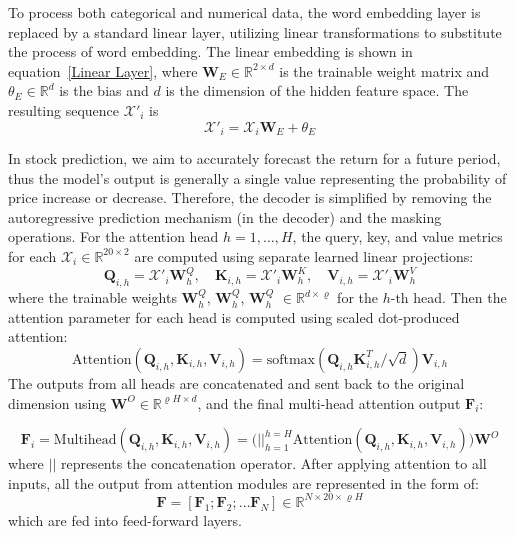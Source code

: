 \documentclass[preprint,12pt]{elsarticle}
\begin{document}
To process both categorical and numerical data, the word embedding layer is replaced by a standard linear layer, utilizing linear transformations to substitute the process of word embedding. The linear embedding is shown in equation~\ref{Linear Layer}, where $\mathbf{W}_E \in \mathbb{R}^{2 \times d}$ is the trainable weight matrix and $\theta_E \in \mathbb{R}^d$ is the bias and $d$ is the dimension of the hidden feature space. The resulting sequence $\mathcal{X}'_i$ is
\begin{equation}
\mathcal{X}'_i = \mathcal{X}_i \mathbf{W}_E + \theta_E
\label{Linear Layer}
\end{equation}

In stock prediction, we aim to accurately forecast the return for a future period, thus the model's output is generally a single value representing the probability of price increase or decrease. Therefore, the decoder is simplified by removing the autoregressive prediction mechanism (in the decoder) and the masking operations. For the attention head $h = 1,\ldots , H$, the query, key, and value metrics for each $\mathcal{X}_i \in \mathbb{R}^{20\times2}$ are computed using separate learned linear projections:
\begin{equation}
\mathbf{Q}_{i,h}=\mathcal{X}'_i \mathbf{W}^{Q}_{h}, \quad \mathbf{K}_{i,h}=\mathcal{X}'_i \mathbf{W}^{K}_{h}, \quad \mathbf{V}_{i,h}=\mathcal{X}'_i \mathbf{W}^{V}_{h}
\label{QKV}
\end{equation}
where the trainable weights $\mathbf{W}^{Q}_{h}$, $\mathbf{W}^{Q}_{h}$, $\mathbf{W}^{Q}_{h}$ $\in \mathbb{R}^{d \times \varrho}$ for the $h$-$\mathrm{th}$ head. Then the attention parameter for each head is computed using scaled dot-produced attention: 
\begin{equation}
\mathrm{Attention}(\mathbf{Q}_{i,h}, \mathbf{K}_{i,h}, \mathbf{V}_{i,h}) = \mathrm{softmax}(\mathbf{Q}_{i,h} \mathbf{K}_{i,h}^{T}/\sqrt{d})\mathbf{V}_{i,h}
\label{attention}
\end{equation}
The outputs from all heads are concatenated and sent back to the original dimension using $\mathbf{W}^O \in \mathbb{R}^{\varrho H \times d}$, and the final multi-head attention output $\mathbf{F}_i$:

\begin{equation}
\mathbf{F}_i = \mathrm{Multihead}(\mathbf{Q}_{i,h},\mathbf{K}_{i,h}, \mathbf{V}_{i,h})
=\big(||^{h=H}_{h=1}\mathrm{Attention}(\mathbf{Q}_{i,h}, \mathbf{K}_{i,h}, \mathbf{V}_{i,h})\big)\mathbf{W}^O
\label{multihead}
\end{equation}
where $||$ represents the concatenation operator. After applying attention to all inputs, all the output from attention modules are represented in the form of:
$$\mathbf{F} = [\mathbf{F}_1; \mathbf{F}_2; \ldots \mathbf{F}_N] \in \mathbb{R}^{N\times20\times \varrho H}$$
which are fed into feed-forward layers. 
\end{document}
